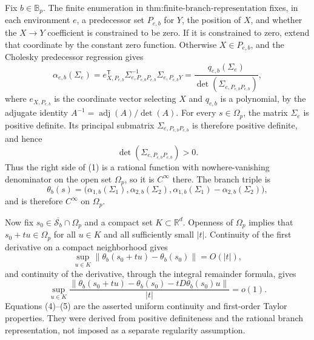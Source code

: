 Fix \(b\in\mathbb B_p\).  The finite enumeration in \(\text{thm:finite-branch-representation}\) fixes, in each environment \(e\), a predecessor set \(P_{e,b}\) for \(Y\), the position of \(X\), and whether the \(X\to Y\) coefficient is constrained to be zero.  If it is constrained to zero, extend that coordinate by the constant zero function.  Otherwise \(X\in P_{e,b}\), and the Cholesky predecessor regression gives
\[
 \alpha_{e,b}(\Sigma_e)
 =e_{X,P_{e,b}}^{\mathsf T}
   \Sigma_{e,P_{e,b}P_{e,b}}^{-1}
   \Sigma_{e,P_{e,b}Y}
 =\frac{q_{e,b}(\Sigma_e)}
        {\det(\Sigma_{e,P_{e,b}P_{e,b}})},
 \tag{1}
\]
where \(e_{X,P_{e,b}}\) is the coordinate vector selecting \(X\) and \(q_{e,b}\) is a polynomial, by the adjugate identity \(A^{-1}=\operatorname{adj}(A)/\det(A)\).  For every \(s\in\Omega_p\), the matrix \(\Sigma_e\) is positive definite.  Its principal submatrix \(\Sigma_{e,P_{e,b}P_{e,b}}\) is therefore positive definite, and hence
\[
 \det(\Sigma_{e,P_{e,b}P_{e,b}})>0.
 \tag{2}
\]
Thus the right side of (1) is a rational function with nowhere-vanishing denominator on the open set \(\Omega_p\), so it is \(C^\infty\) there.  The branch triple is
\[
 \theta_b(s)=
 \bigl(\alpha_{1,b}(\Sigma_1),
       \alpha_{2,b}(\Sigma_2),
       \alpha_{1,b}(\Sigma_1)-\alpha_{2,b}(\Sigma_2)\bigr),
 \tag{3}
\]
and is therefore \(C^\infty\) on \(\Omega_p\).

Now fix \(s_0\in\overline{\mathcal S_b}\cap\Omega_p\) and a compact set \(K\subset\mathbb R^d\).  Openness of \(\Omega_p\) implies that \(s_0+t u\in\Omega_p\) for all \(u\in K\) and all sufficiently small \(|t|\).  Continuity of the first derivative on a compact neighborhood gives
\[
 \sup_{u\in K}\|\theta_b(s_0+t u)-\theta_b(s_0)\|=O(|t|),
 \tag{4}
\]
and continuity of the derivative, through the integral remainder formula, gives
\[
 \sup_{u\in K}
 \frac{\|\theta_b(s_0+t u)-\theta_b(s_0)
 -tD\theta_b(s_0)u\|}{|t|}=o(1).
 \tag{5}
\]
Equations (4)--(5) are the asserted uniform continuity and first-order Taylor properties.  They were derived from positive definiteness and the rational branch representation, not imposed as a separate regularity assumption.